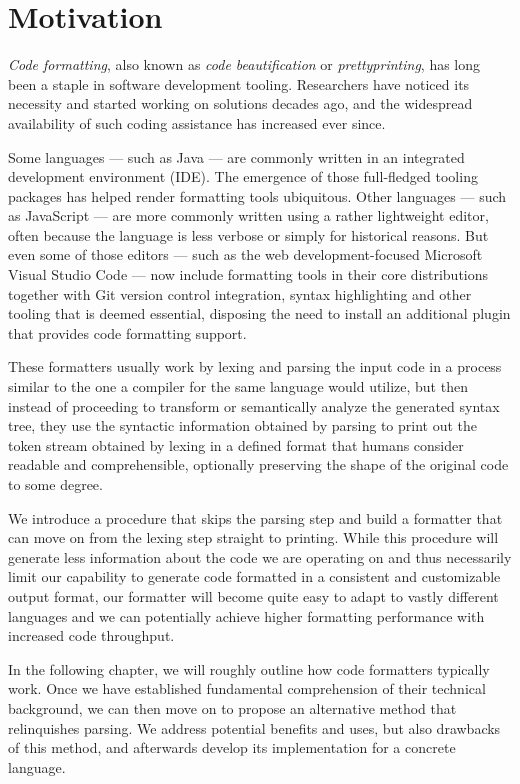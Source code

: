 \chapter{Motivation}
\textit{Code formatting}, also known as \textit{code beautification} or \textit{prettyprinting},
has long been a staple in software development tooling.
Researchers have noticed its necessity and started working on solutions decades ago,
\autocite{syntaxDirectedPrettyprinting}
and the widespread availability of such coding assistance has increased ever since.

Some languages --- such as Java --- are commonly written in an integrated development environment (IDE).
The emergence of those full-fledged tooling packages has helped render formatting tools ubiquitous.
Other languages --- such as JavaScript --- are more commonly written using a rather lightweight editor,
often because the language is less verbose or simply for historical reasons.
But even some of those editors --- such as the web development-focused Microsoft Visual Studio Code ---
now include formatting tools in their core distributions together with
Git version control integration, syntax highlighting and other tooling that is deemed essential,
disposing the need to install an additional plugin that provides code formatting support.
\autocite{vsCodeJavascriptDoc}

These formatters usually work by lexing and parsing the input code
in a process similar to the one a compiler for the same language would utilize,
but then instead of proceeding to transform or semantically analyze the generated syntax tree,
they use the syntactic information obtained by parsing
to print out the token stream obtained by lexing
in a defined format that humans consider readable and comprehensible,
optionally preserving the shape of the original code to some degree.
\autocite{prettyGoodFormattingPipeline}

We introduce a procedure that skips the parsing step and
build a formatter that can move on from the lexing step straight to printing.
While this procedure will generate less information about the code we are operating on and
thus necessarily limit our capability to generate code
formatted in a consistent and customizable output format,
our formatter will become quite easy to adapt to vastly different languages and
we can potentially achieve higher formatting performance with increased code throughput.

In the following chapter, we will roughly outline how code formatters typically work.
Once we have established fundamental comprehension of their technical background,
we can then move on to propose an alternative method that relinquishes parsing.
We address potential benefits and uses, but also drawbacks of this method,
and afterwards develop its implementation for a concrete language.
